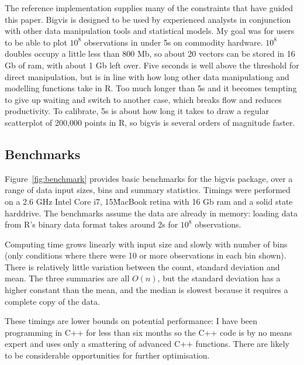 \documentclass[journal]{vgtc}                %
\begin{document}
The reference implementation supplies many of the constraints that have guided this paper. Bigvis is designed to be used by experienced analysts in conjunction with other data manipulation tools and statistical models. My goal was for users to be able to plot $10^8$ observations in under 5s on commodity hardware. $10^8$ doubles occupy a little less than 800 Mb, so about 20 vectors can be stored in 16 Gb of ram, with about 1 Gb left over. Five seconds is well above the threshold for direct manipulation, but is in line with how long other data manipulationg and modelling functions take in R. Too much longer than 5s and it becomes tempting to give up waiting and switch to another case, which breaks flow and reduces productivity. To calibrate, 5s is about how long it takes to draw a regular scatterplot of 200,000 points in R, so bigvis is several orders of magnitude faster.

\subsection{Benchmarks}
\label{sub:benchmarks}

Figure~\ref{fig:benchmark} provides basic benchmarks for the bigvis package, over a range of data input sizes, bins and summary statistics. Timings were performed on a 2.6 GHz Intel Core i7, 15\" MacBook retina with 16 Gb ram and a solid state harddrive. The benchmarks assume the data are already in memory: loading data from R's binary data format takes around 2s for $10^8$ observations.

Computing time grows linearly with input size and slowly with number of bins (only conditions where there were 10 or more observations in each bin shown). There is relatively little variation between the count, standard deviation and mean. The three summaries are all $O(n)$, but the standard deviation has a higher constant than the mean, and the median is slowest because it requires a complete copy of the data. 

These timings are lower bounds on potential performance: I have been programming in C++ for less than six months so the C++ code is by no means expert and uses only a smattering of advanced C++ functions. There are likely to be considerable opportunities for further optimisation.
\end{document}

